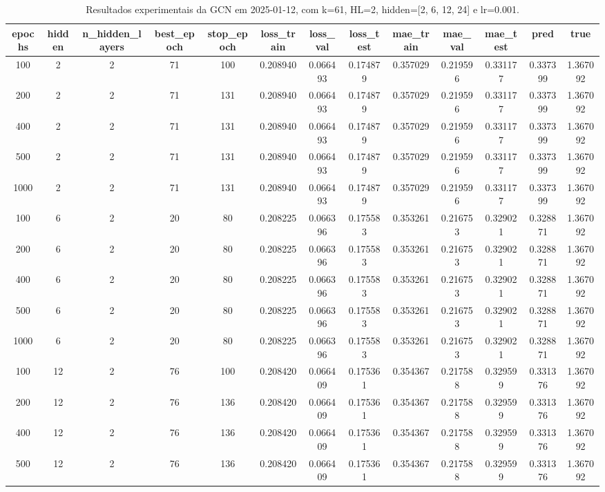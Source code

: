 \begin{table}[h]
\centering
\caption{Resultados experimentais da GCN em 2025-01-12, com k=61, HL=2, hidden=[2, 6, 12, 24] e lr=0.001.}
\label{tab:gcn_results_k61_hl2_d20250112}
\begin{tabular}{ccccccccccccc}
\toprule
epochs & hidden & n\_hidden\_layers & best\_epoch & stop\_epoch & loss\_train & loss\_val & loss\_test & mae\_train & mae\_val & mae\_test & pred & true \\
\midrule
100 & 2 & 2 & 71 & 100 & 0.208940 & 0.066493 & 0.174879 & 0.357029 & 0.219596 & 0.331177 & 0.337399 & 1.367092 \\
200 & 2 & 2 & 71 & 131 & 0.208940 & 0.066493 & 0.174879 & 0.357029 & 0.219596 & 0.331177 & 0.337399 & 1.367092 \\
400 & 2 & 2 & 71 & 131 & 0.208940 & 0.066493 & 0.174879 & 0.357029 & 0.219596 & 0.331177 & 0.337399 & 1.367092 \\
500 & 2 & 2 & 71 & 131 & 0.208940 & 0.066493 & 0.174879 & 0.357029 & 0.219596 & 0.331177 & 0.337399 & 1.367092 \\
1000 & 2 & 2 & 71 & 131 & 0.208940 & 0.066493 & 0.174879 & 0.357029 & 0.219596 & 0.331177 & 0.337399 & 1.367092 \\
100 & 6 & 2 & 20 & 80 & 0.208225 & 0.066396 & 0.175583 & 0.353261 & 0.216753 & 0.329021 & 0.328871 & 1.367092 \\
200 & 6 & 2 & 20 & 80 & 0.208225 & 0.066396 & 0.175583 & 0.353261 & 0.216753 & 0.329021 & 0.328871 & 1.367092 \\
400 & 6 & 2 & 20 & 80 & 0.208225 & 0.066396 & 0.175583 & 0.353261 & 0.216753 & 0.329021 & 0.328871 & 1.367092 \\
500 & 6 & 2 & 20 & 80 & 0.208225 & 0.066396 & 0.175583 & 0.353261 & 0.216753 & 0.329021 & 0.328871 & 1.367092 \\
1000 & 6 & 2 & 20 & 80 & 0.208225 & 0.066396 & 0.175583 & 0.353261 & 0.216753 & 0.329021 & 0.328871 & 1.367092 \\
100 & 12 & 2 & 76 & 100 & 0.208420 & 0.066409 & 0.175361 & 0.354367 & 0.217588 & 0.329599 & 0.331376 & 1.367092 \\
200 & 12 & 2 & 76 & 136 & 0.208420 & 0.066409 & 0.175361 & 0.354367 & 0.217588 & 0.329599 & 0.331376 & 1.367092 \\
400 & 12 & 2 & 76 & 136 & 0.208420 & 0.066409 & 0.175361 & 0.354367 & 0.217588 & 0.329599 & 0.331376 & 1.367092 \\
500 & 12 & 2 & 76 & 136 & 0.208420 & 0.066409 & 0.175361 & 0.354367 & 0.217588 & 0.329599 & 0.331376 & 1.367092 \\

\end{tabular}
\end{table}

